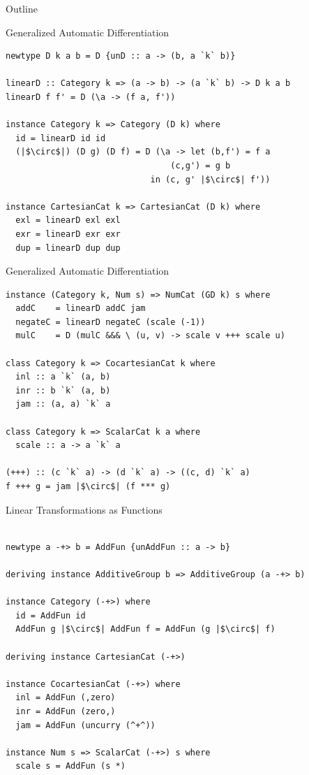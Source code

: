 \documentclass[12pt]{beamer}
\begin{document}
\begin{frame}{Outline}
\tableofcontents[currentsection]
\end{frame}

\begin{frame}[fragile]{Generalized Automatic Differentiation}
\begin{verbatim}
newtype D k a b = D {unD :: a -> (b, a `k` b)}

linearD :: Category k => (a -> b) -> (a `k` b) -> D k a b
linearD f f' = D (\a -> (f a, f'))

instance Category k => Category (D k) where
  id = linearD id id
  (|$\circ$|) (D g) (D f) = D (\a -> let (b,f') = f a
                                 (c,g') = g b
                             in (c, g' |$\circ$| f'))
                             
instance CartesianCat k => CartesianCat (D k) where
  exl = linearD exl exl
  exr = linearD exr exr
  dup = linearD dup dup
\end{verbatim}
\end{frame}

\begin{frame}[fragile]{Generalized Automatic Differentiation}
  \begin{verbatim}
instance (Category k, Num s) => NumCat (GD k) s where
  addC    = linearD addC jam
  negateC = linearD negateC (scale (-1))
  mulC    = D (mulC &&& \ (u, v) -> scale v +++ scale u)

class Category k => CocartesianCat k where
  inl :: a `k` (a, b)
  inr :: b `k` (a, b)
  jam :: (a, a) `k` a

class Category k => ScalarCat k a where
  scale :: a -> a `k` a

(+++) :: (c `k` a) -> (d `k` a) -> ((c, d) `k` a)
f +++ g = jam |$\circ$| (f *** g)
\end{verbatim}
\end{frame}

\begin{frame}[fragile]{Linear Transformations as Functions}
  \begin{verbatim}

newtype a -+> b = AddFun {unAddFun :: a -> b}

deriving instance AdditiveGroup b => AdditiveGroup (a -+> b)

instance Category (-+>) where
  id = AddFun id
  AddFun g |$\circ$| AddFun f = AddFun (g |$\circ$| f)

deriving instance CartesianCat (-+>)

instance CocartesianCat (-+>) where
  inl = AddFun (,zero)
  inr = AddFun (zero,)
  jam = AddFun (uncurry (^+^))

instance Num s => ScalarCat (-+>) s where
  scale s = AddFun (s *)

\end{verbatim}
\end{frame}
\end{document}
